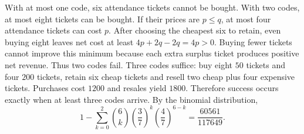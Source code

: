 With at most one code, six attendance tickets cannot be bought. With two codes, at most eight tickets can be bought. If their prices are $ p\le q $, at most four attendance tickets can cost $ p $. After choosing the cheapest six to retain, even buying eight leaves net cost at least $ 4p+2q-2q=4p>0 $. Buying fewer tickets cannot improve this minimum because each extra surplus ticket produces positive net revenue. Thus two codes fail. Three codes suffice: buy eight $ 50 $ tickets and four $ 200 $ tickets, retain six cheap tickets and resell two cheap plus four expensive tickets. Purchases cost $ 1200 $ and resales yield $ 1800 $. Therefore success occurs exactly when at least three codes arrive. By the binomial distribution,
\[\boxed{1-\sum_{k=0}^2\binom6k\left(\dfrac{3}{7}\right)^k\left(\dfrac{4}{7}\right)^{6-k}=\dfrac{60561}{117649}}.\]
